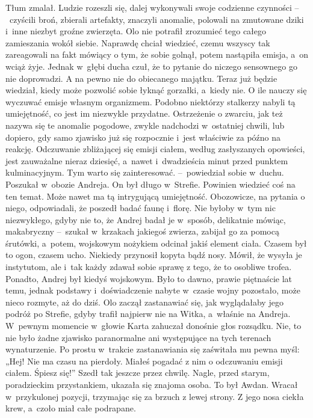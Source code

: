 \documentclass[../MAIN.tex]{subfiles}
\begin{document}
\pp
Tłum zmalał. Ludzie rozeszli się, dalej wykonywali swoje codzienne czynności --~czyścili broń, zbierali artefakty, znaczyli anomalie, polowali na zmutowane dziki i~inne niezbyt groźne zwierzęta. Olo nie potrafił zrozumieć tego całego zamieszania wokół siebie. Naprawdę chciał wiedzieć, czemu wszyscy tak zareagowali na fakt mówiący o tym, że sobie golnął, potem nastąpiła emisja, a~on wciąż żyje. Jednak w~głębi ducha czuł, że to pytanie do niczego sensownego go nie doprowadzi. A na pewno nie do obiecanego majątku. Teraz już będzie wiedział, kiedy może pozwolić sobie łyknąć gorzałki, a~kiedy nie. O ile nauczy się wyczuwać emisje własnym organizmem. Podobno niektórzy stalkerzy nabyli tą umiejętność, co jest im niezwykle przydatne. Ostrzeżenie o zwarciu, jak też nazywa się te anomalie pogodowe, zwykle nadchodzi w~ostatniej chwili, lub dopiero, gdy samo zjawisko już się rozpocznie i~jest właściwie za późno na reakcję. Odczuwanie zbliżającej się emisji ciałem, według zasłyszanych opowieści, jest zauważalne nieraz
dziesięć, a~nawet i~dwadzieścia minut przed punktem kulminacyjnym.
\dd
\sd
\xx Tym warto się zainteresować. --~powiedział sobie w~duchu.
\qd
\hspace{26.5em} Poszukał w~obozie Andreja. On był długo w~Strefie. Powinien wiedzieć coś na ten temat. Może nawet ma tą intrygującą umiejętność. Obozowicze, na pytania o niego, odpowiadali, że poszedł badać faunę i~florę. Nie byłoby w~tym nic niezwykłego, gdyby nie to, że Andrej badał je w~sposób, delikatnie mówiąc, makabryczny --~szukał w~krzakach jakiegoś zwierza, zabijał go za pomocą śrutówki, a~potem, wojskowym nożykiem odcinał jakiś element ciała. Czasem był to ogon, czasem ucho. Niekiedy przynosił kopyta bądź nosy. Mówił, że wysyła je instytutom, ale i~tak każdy zdawał sobie sprawę z tego, że to osobliwe trofea.
\pp
Ponadto, Andrej był kiedyś wojskowym. Było to dawno, prawie piętnaście lat temu, jednak podstawy i~doświadczenie nabyte w~czasie wojny pozostało, może nieco rozmyte, aż do dziś. Olo zaczął zastanawiać się, jak wyglądałaby jego podróż po Strefie, gdyby trafił najpierw nie na Witka, a~właśnie na Andreja. W~pewnym momencie w~głowie Karta zahuczał donośnie głos rozsądku. Nie, to nie było żadne zjawisko paranormalne ani występujące na tych terenach wynaturzenie. Po prostu w~trakcie zastanawiania się zaświtała mu pewna myśl: „Hej! Nie ma czasu na pierdoły. Miałeś pogadać z nim o odczuwaniu emisji ciałem. Śpiesz się!”
\pp
Szedł tak jeszcze przez chwilę. Nagle, przed starym, poradzieckim przystankiem, ukazała się znajoma osoba. To był Awdan. Wracał w~przykulonej pozycji, trzymając się za brzuch z lewej strony. Z jego nosa ciekła krew, a~czoło miał całe podrapane.
\end{document}
